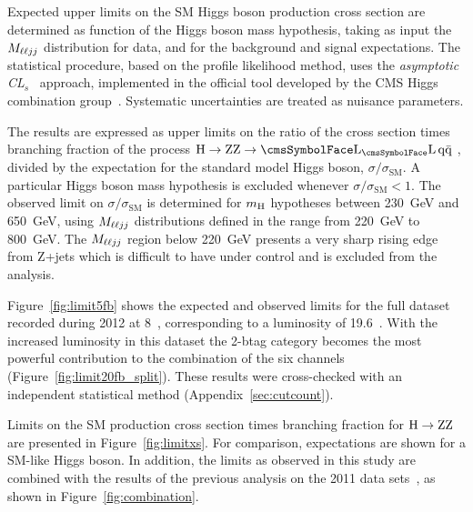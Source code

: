 Expected upper limits on the SM Higgs boson production cross section are determined as function of the Higgs boson mass hypothesis, taking as input the $M_{\ell\ell jj}$ distribution for data, and for the background and signal expectations. The statistical procedure, based on the profile likelihood method, uses the \textit{asymptotic CL$_s$}~\cite{AsymptCLs} approach, implemented in the official tool developed by the CMS Higgs combination group~\cite{HiggsLimitTWiki}. Systematic uncertainties are treated as nuisance parameters.

The results are expressed as upper limits on the ratio of the cross section times branching fraction of the process $\Htollqq\ $, divided by the expectation for the standard model Higgs boson, $\sigma / \sigma_\mathrm{SM}$. A particular Higgs boson mass hypothesis is excluded whenever \mbox{$\sigma / \sigma_\mathrm{SM} < 1$}. The observed limit on $\sigma / \sigma_\mathrm{SM}$ is determined for $m_{\mathrm{H}}$ hypotheses between 230~GeV and 650~GeV, using $M_{\ell\ell jj}$ distributions defined in the range from 220~GeV to 800~GeV. The $M_{\ell\ell jj}$ region below 220~GeV presents a very sharp rising edge from Z+jets which is difficult to have under control and is excluded from the analysis.

Figure~\ref{fig:limit5fb} shows the expected and observed limits for the full dataset recorded during 2012 at 8~\TeV{}, corresponding to a luminosity of 19.6~\fbinv{}. With the increased luminosity in this dataset the 2-btag category becomes the most powerful contribution to the combination of the six channels (Figure~\ref{fig:limit20fb_split}). These results were cross-checked with an independent statistical method (Appendix~\ref{sec:cutcount}).

Limits on the SM production cross section times branching fraction for $\mathrm{\mathrm{H}\rightarrow\mathrm{Z}\mathrm{Z}}$ are presented in Figure~\ref{fig:limitxs}. For comparison, expectations are shown for a SM-like Higgs boson. In addition, the limits as observed in this study are combined with the results of the previous analysis on the 2011 data sets~\cite{HIG-11-027}, as shown in Figure~\ref{fig:combination}.



